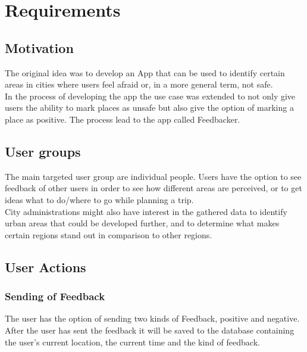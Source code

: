 

\section{Requirements}

\subsection{Motivation}
The original idea was to develop an App that can be used to identify certain areas in cities where users feel afraid or, in a more general term, not safe.\\
In the process of developing the app the use case was extended to not only give users the ability to mark places as unsafe but also give the option of marking a place as positive. The process lead to the app called Feedbacker.

\subsection{User groups}
The main targeted user group are individual people. Users have the option to see feedback of other users in order to see how different areas are perceived, or to get ideas what to do/where to go while planning a trip. \\
City administrations might also have interest in the gathered data to identify urban areas that could be developed further, and to determine what makes certain regions stand out in comparison to other regions.

\subsection{User Actions}
\subsubsection{Sending of Feedback}
The user has the option of sending two kinds of Feedback, positive and negative. After the user has sent the feedback it will be saved to the database containing the user's current location, the current time and the kind of feedback.

